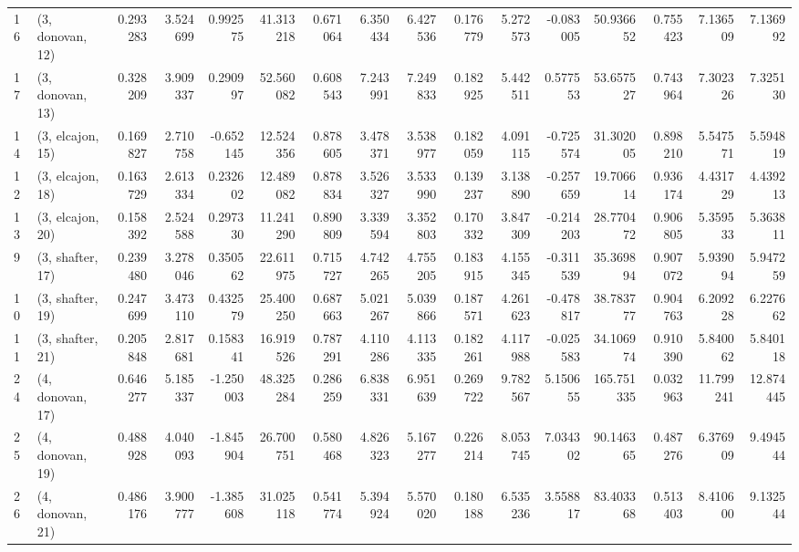 \begin{tabular}{llrrrrrrrrrrrrrr}
16 &  (3, donovan, 12) &   0.293283 &  3.524699 &  0.992575 &   41.313218 &  0.671064 &   6.350434 &   6.427536 &  0.176779 &  5.272573 & -0.083005 &   50.936652 &  0.755423 &   7.136509 &   7.136992 \\
17 &  (3, donovan, 13) &   0.328209 &  3.909337 &  0.290997 &   52.560082 &  0.608543 &   7.243991 &   7.249833 &  0.182925 &  5.442511 &  0.577553 &   53.657527 &  0.743964 &   7.302326 &   7.325130 \\
14 &  (3, elcajon, 15) &   0.169827 &  2.710758 & -0.652145 &   12.524356 &  0.878605 &   3.478371 &   3.538977 &  0.182059 &  4.091115 & -0.725574 &   31.302005 &  0.898210 &   5.547571 &   5.594819 \\
12 &  (3, elcajon, 18) &   0.163729 &  2.613334 &  0.232602 &   12.489082 &  0.878834 &   3.526327 &   3.533990 &  0.139237 &  3.138890 & -0.257659 &   19.706614 &  0.936174 &   4.431729 &   4.439213 \\
13 &  (3, elcajon, 20) &   0.158392 &  2.524588 &  0.297330 &   11.241290 &  0.890809 &   3.339594 &   3.352803 &  0.170332 &  3.847309 & -0.214203 &   28.770472 &  0.906805 &   5.359533 &   5.363811 \\
9  &  (3, shafter, 17) &   0.239480 &  3.278046 &  0.350562 &   22.611975 &  0.715727 &   4.742265 &   4.755205 &  0.183915 &  4.155345 & -0.311539 &   35.369894 &  0.907072 &   5.939094 &   5.947259 \\
10 &  (3, shafter, 19) &   0.247699 &  3.473110 &  0.432579 &   25.400250 &  0.687663 &   5.021267 &   5.039866 &  0.187571 &  4.261623 & -0.478817 &   38.783777 &  0.904763 &   6.209228 &   6.227662 \\
11 &  (3, shafter, 21) &   0.205848 &  2.817681 &  0.158341 &   16.919526 &  0.787291 &   4.110286 &   4.113335 &  0.182261 &  4.117988 & -0.025583 &   34.106974 &  0.910390 &   5.840062 &   5.840118 \\
24 &  (4, donovan, 17) &   0.646277 &  5.185337 & -1.250003 &   48.325284 &  0.286259 &   6.838331 &   6.951639 &  0.269722 &  9.782567 &  5.150655 &  165.751335 &  0.032963 &  11.799241 &  12.874445 \\
25 &  (4, donovan, 19) &   0.488928 &  4.040093 & -1.845904 &   26.700751 &  0.580468 &   4.826323 &   5.167277 &  0.226214 &  8.053745 &  7.034302 &   90.146365 &  0.487276 &   6.376909 &   9.494544 \\
26 &  (4, donovan, 21) &   0.486176 &  3.900777 & -1.385608 &   31.025118 &  0.541774 &   5.394924 &   5.570020 &  0.180188 &  6.535236 &  3.558817 &   83.403368 &  0.513403 &   8.410600 &   9.132544 \\

\end{tabular}
